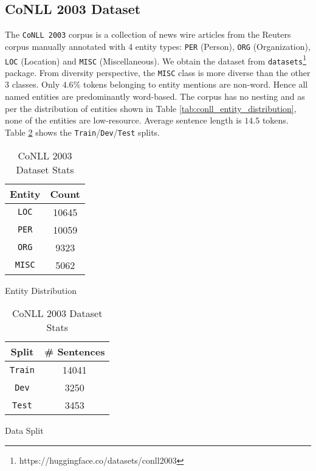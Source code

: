 \subsection{CoNLL 2003 Dataset}

The \texttt{CoNLL 2003}\cite{sang2003introduction} corpus is a collection of news wire articles from the Reuters corpus manually annotated with 4 entity types: \texttt{PER} (Person), \texttt{ORG} (Organization), \texttt{LOC} (Location) and \texttt{MISC} (Miscellaneous). We obtain the dataset from \texttt{datasets}\footnote{https://huggingface.co/datasets/conll2003} package. From diversity perspective, the \texttt{MISC} class is more diverse than the other 3 classes. Only $4.6\%$ tokens belonging to entity mentions are non-word. Hence all named entities are predominantly word-based. The corpus has no nesting and as per the distribution of entities shown in Table \ref{tab:conll_entity_distribution}, none of the entities are low-resource. Average sentence length is $14.5$ tokens. Table \ref{tab:conll_dataset_split} shows the \texttt{Train}/\texttt{Dev}/\texttt{Test} splits. 

\begin{table}[h!]
\begin{subtable}[t]{.48\linewidth}
\centering
\begin{tabular}{|c|c|}\hline
	\textbf{Entity} & \textbf{Count}\\\hline
	\texttt{LOC} & 10645\\\hline
	\texttt{PER} & 10059\\\hline
	\texttt{ORG} & 9323\\\hline
	\texttt{MISC} & 5062\\\hline
	\end{tabular}
	\caption{Entity Distribution}
	\label{tab:conll_entity_distribution}
\end{subtable}
\begin{subtable}[t]{.48\linewidth}
\centering
\begin{tabular}{|c|c|}\hline
	\textbf{Split} & \textbf{\# Sentences}\\\hline
	\texttt{Train} & 14041\\\hline
	\texttt{Dev} & 3250\\\hline
	\texttt{Test} & 3453\\\hline
	\end{tabular}
	\caption{Data Split}
	\label{tab:conll_dataset_split}
\end{subtable}
\caption{CoNLL 2003 Dataset Stats}
\end{table}

